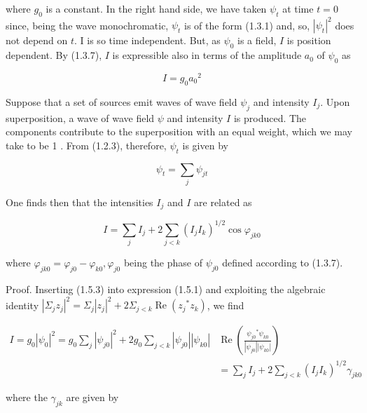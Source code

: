 \documentclass{article}
\begin{document}
where $g_{0}$ is a constant. In the right hand side, we have taken $\psi_{t}$ at time $t=0$ since, being the wave monochromatic, $\psi_{t}$ is of the form (1.3.1) and, so, $\left|\psi_{t}\right|^{2}$ does not depend on $t$. I is so time independent. But, as $\psi_{0}$ is a field, $I$ is position dependent. By (1.3.7), $I$ is expressible also in terms of the amplitude $a_{0}$ of $\psi_{0}$ as
 
\begin{equation*}
I=g_{0} a_{0}{ }^{2} \tag{1.5.2}
\end{equation*}
 

Suppose that a set of sources emit waves of wave field $\psi_{j}$ and intensity $I_{j}$. Upon superposition, a wave of wave field $\psi$ and intensity $I$ is produced. The components contribute to the superposition with an equal weight, which we may take to be 1 . From (1.2.3), therefore, $\psi_{t}$ is given by
 
\begin{equation*}
\psi_{t}=\sum_{j} \psi_{j t} \tag{1.5.3}
\end{equation*}
 

One finds then that the intensities $I_{j}$ and $I$ are related as
 
\begin{equation*}
I=\sum_{j} I_{j}+2 \sum_{j<k}\left(I_{j} I_{k}\right)^{1 / 2} \cos \varphi_{j k 0} \tag{1.5.4}
\end{equation*}
 
where $\varphi_{j k 0}=\varphi_{j 0}-\varphi_{k 0}, \varphi_{j 0}$ being the phase of $\psi_{j 0}$ defined according to (1.3.7).

Proof. Inserting (1.5.3) into expression (1.5.1) and exploiting the algebraic identity $\left|\Sigma_{j} z_{j}\right|^{2}=\Sigma_{j}\left|z_{j}\right|^{2}+2 \Sigma_{j<k} \operatorname{Re}\left(z_{j}{ }^{*} z_{k}\right)$, we find
 
\begin{align*}
I=g_{0}\left|\psi_{0}\right|^{2}=g_{0} \sum_{j}\left|\psi_{j 0}\right|^{2}+2 g_{0} \sum_{j<k}\left|\psi_{j 0}\right|\left|\psi_{k 0}\right| & \operatorname{Re}\left(\frac{\psi_{j 0}{ }^{*} \psi_{k 0}}{\left|\psi_{j 0}\right|\left|\psi_{k 0}\right|}\right)  \tag{1.5.5}\\
& =\sum_{j} I_{j}+2 \sum_{j<k}\left(I_{j} I_{k}\right)^{1 / 2} \gamma_{j k 0}
\end{align*}
 
where the $\gamma_{j k}$ are given by
 
\end{document}
